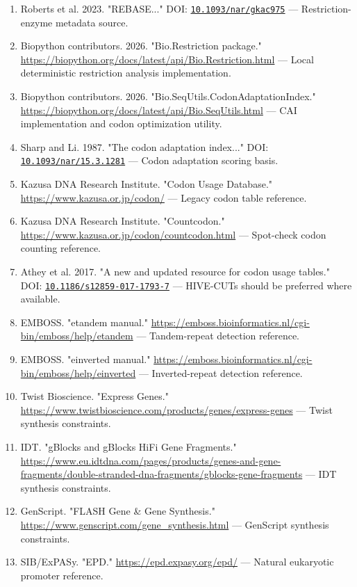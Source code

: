 \documentclass[11pt]{report}
\begin{document}
\begin{enumerate}
\item Roberts et al. 2023. "REBASE..." DOI: \href{https://doi.org/10.1093/nar/gkac975}{\nolinkurl{10.1093/nar/gkac975}} — Restriction-enzyme metadata source.
\item Biopython contributors. 2026. "Bio.Restriction package." \url{https://biopython.org/docs/latest/api/Bio.Restriction.html} — Local deterministic restriction analysis implementation.
\item Biopython contributors. 2026. "Bio.SeqUtils.CodonAdaptationIndex." \url{https://biopython.org/docs/latest/api/Bio.SeqUtils.html} — CAI implementation and codon optimization utility.
\item Sharp and Li. 1987. "The codon adaptation index..." DOI: \href{https://doi.org/10.1093/nar/15.3.1281}{\nolinkurl{10.1093/nar/15.3.1281}} — Codon adaptation scoring basis.
\item Kazusa DNA Research Institute. "Codon Usage Database." \url{https://www.kazusa.or.jp/codon/} — Legacy codon table reference.
\item Kazusa DNA Research Institute. "Countcodon." \url{https://www.kazusa.or.jp/codon/countcodon.html} — Spot-check codon counting reference.
\item Athey et al. 2017. "A new and updated resource for codon usage tables." DOI: \href{https://doi.org/10.1186/s12859-017-1793-7}{\nolinkurl{10.1186/s12859-017-1793-7}} — HIVE-CUTs should be preferred where available.
\item EMBOSS. "etandem manual." \url{https://emboss.bioinformatics.nl/cgi-bin/emboss/help/etandem} — Tandem-repeat detection reference.
\item EMBOSS. "einverted manual." \url{https://emboss.bioinformatics.nl/cgi-bin/emboss/help/einverted} — Inverted-repeat detection reference.
\item Twist Bioscience. "Express Genes." \url{https://www.twistbioscience.com/products/genes/express-genes} — Twist synthesis constraints.
\item IDT. "gBlocks and gBlocks HiFi Gene Fragments." \url{https://www.eu.idtdna.com/pages/products/genes-and-gene-fragments/double-stranded-dna-fragments/gblocks-gene-fragments} — IDT synthesis constraints.
\item GenScript. "FLASH Gene \& Gene Synthesis." \url{https://www.genscript.com/gene_synthesis.html} — GenScript synthesis constraints.
\item SIB/ExPASy. "EPD." \url{https://epd.expasy.org/epd/} — Natural eukaryotic promoter reference.

\end{enumerate}
\end{document}
